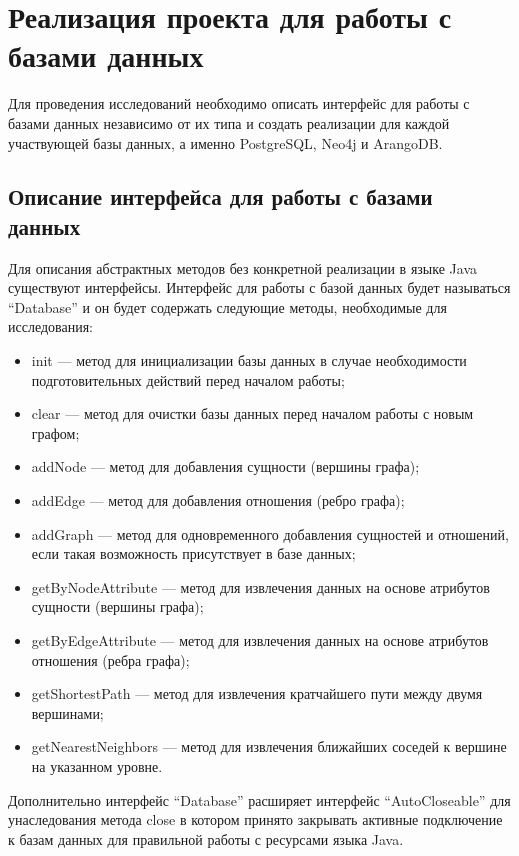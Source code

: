 \chapter{Реализация проекта для работы с базами данных}

Для проведения исследований необходимо описать интерфейс для работы с базами данных независимо от их типа и создать реализации для каждой участвующей базы данных, а именно PostgreSQL, Neo4j и ArangoDB.


\section{Описание интерфейса для работы с базами данных}

Для описания абстрактных методов без конкретной реализации в языке Java существуют интерфейсы. Интерфейс для работы с базой данных будет называться “Database” и он будет содержать следующие методы, необходимые для исследования:

\begin{itemize}
    \item init — метод для инициализации базы данных в случае необходимости подготовительных действий перед началом работы;
    \item clear — метод для очистки базы данных перед началом работы с новым графом;
    \item addNode — метод для добавления сущности (вершины графа);
    \item addEdge — метод для добавления отношения (ребро графа);
    \item addGraph — метод для одновременного добавления сущностей и отношений, если такая возможность присутствует в базе данных;
    \item getByNodeAttribute — метод для извлечения данных на основе атрибутов сущности (вершины графа);
    \item getByEdgeAttribute — метод для извлечения данных на основе атрибутов отношения (ребра графа);
    \item getShortestPath — метод для извлечения кратчайшего пути между двумя вершинами;
    \item getNearestNeighbors — метод для извлечения ближайших соседей к вершине на указанном уровне.
\end{itemize}

Дополнительно интерфейс “Database” расширяет интерфейс “AutoCloseable” для унаследования метода close в котором принято закрывать активные подключение к базам данных для правильной работы с ресурсами языка Java.


